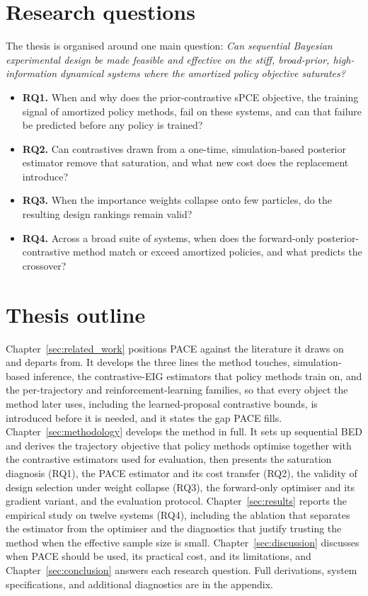 \section{Research questions}
\label{sec:intro-rqs}

The thesis is organised around one main question: \textit{Can sequential Bayesian experimental design be made feasible and effective on the stiff, broad-prior, high-information dynamical systems where the amortized policy
objective saturates?}

\begin{itemize}[leftmargin=*,itemsep=0.2em]
  \item \textbf{RQ1.} When and why does the prior-contrastive sPCE objective, the training signal
  of amortized policy methods, fail on these systems, and can that failure be predicted before any
  policy is trained?
  \item \textbf{RQ2.} Can contrastives drawn from a one-time, simulation-based posterior estimator
  remove that saturation, and what new cost does the replacement introduce?
  \item \textbf{RQ3.} When the importance weights collapse onto few particles, do the resulting
  design rankings remain valid?
  \item \textbf{RQ4.} Across a broad suite of systems, when does the forward-only
  posterior-contrastive method match or exceed amortized policies, and what predicts the crossover?
\end{itemize}

\section{Thesis outline}
\label{sec:intro-outline}

Chapter~\ref{sec:related_work} positions PACE against the literature it draws on and departs from.
It develops the three lines the method touches, simulation-based inference, the contrastive-EIG
estimators that policy methods train on, and the per-trajectory and reinforcement-learning
families, so that every object the method later uses, including the learned-proposal contrastive
bounds, is introduced before it is needed, and it states the gap PACE fills.
Chapter~\ref{sec:methodology} develops the method in full. It sets up sequential BED and derives
the trajectory objective that policy methods optimise together with the contrastive estimators
used for evaluation, then presents the saturation diagnosis (RQ1), the PACE estimator and its cost
transfer (RQ2), the validity of design selection under weight collapse (RQ3), the forward-only
optimiser and its gradient variant, and the evaluation protocol. Chapter~\ref{sec:results} reports
the empirical study on twelve systems (RQ4), including the ablation that separates the estimator
from the optimiser and the diagnostics that justify trusting the method when the effective sample
size is small. Chapter~\ref{sec:discussion} discusses when PACE should be used, its practical cost,
and its limitations, and Chapter~\ref{sec:conclusion} answers each research question. Full
derivations, system specifications, and additional diagnostics are in the appendix.

